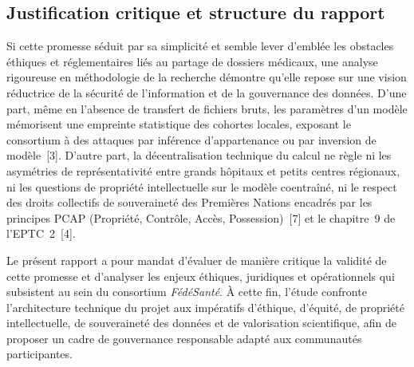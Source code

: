 \subsection{Justification critique et structure du rapport}

Si cette promesse séduit par sa simplicité et semble lever d’emblée les obstacles éthiques et réglementaires liés au partage de dossiers médicaux, une analyse rigoureuse en méthodologie de la recherche démontre qu’elle repose sur une vision réductrice de la sécurité de l’information et de la gouvernance des données. D’une part, même en l’absence de transfert de fichiers bruts, les paramètres d’un modèle mémorisent une empreinte statistique des cohortes locales, exposant le consortium à des attaques par inférence d’appartenance ou par inversion de modèle~[3]. D’autre part, la décentralisation technique du calcul ne règle ni les asymétries de représentativité entre grands hôpitaux et petits centres régionaux, ni les questions de propriété intellectuelle sur le modèle coentraîné, ni le respect des droits collectifs de souveraineté des Premières Nations encadrés par les principes PCAP\textregistered{} (Propriété, Contrôle, Accès, Possession)~[7] et le chapitre~9 de l’EPTC~2~[4].

Le présent rapport a pour mandat d’évaluer de manière critique la validité de cette promesse et d’analyser les enjeux éthiques, juridiques et opérationnels qui subsistent au sein du consortium \emph{FédéSanté}. À cette fin, l’étude confronte l’architecture technique du projet aux impératifs d’éthique, d’équité, de propriété intellectuelle, de souveraineté des données et de valorisation scientifique, afin de proposer un cadre de gouvernance responsable adapté aux communautés participantes.




